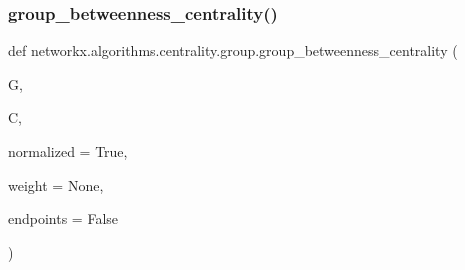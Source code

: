 \subsubsection{\texorpdfstring{group\+\_\+betweenness\+\_\+centrality()}{group\_betweenness\_centrality()}}
{\footnotesize\ttfamily def networkx.\+algorithms.\+centrality.\+group.\+group\+\_\+betweenness\+\_\+centrality (\begin{DoxyParamCaption}\item[{}]{G,  }\item[{}]{C,  }\item[{}]{normalized = {\ttfamily True},  }\item[{}]{weight = {\ttfamily None},  }\item[{}]{endpoints = {\ttfamily False} }\end{DoxyParamCaption})}

